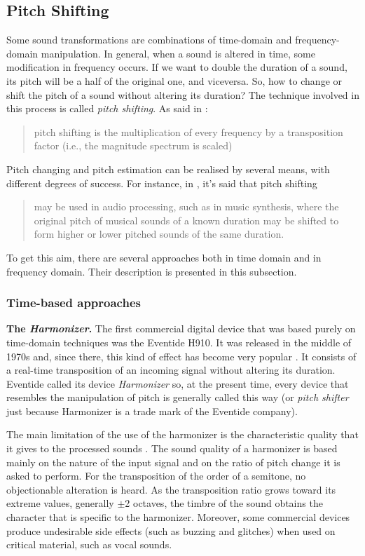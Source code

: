\subsection{Pitch Shifting}
\label{art1}
Some sound transformations are combinations of time-domain and frequency-domain manipulation. 
In general, when a sound is altered in time, some modification in frequency occurs. If we want to double the duration of a sound, its pitch will be a half of the original one, and viceversa. So, how to change or shift the pitch of a sound without altering its duration? The technique involved in this process is called \emph{pitch shifting}. As said in \cite{zolder2011dafx}:
\begin{quote}
\scriptsize pitch shifting is the multiplication of every frequency by a transposition factor (i.e., the magnitude spectrum is scaled)
\end{quote}

Pitch changing and pitch estimation can be realised by several means, with different degrees of success. 
For instance, in \cite{laroche2003phase}, it's said that pitch shifting
\begin{quote}
\scriptsize may be used in audio processing, such as in music synthesis, where the original pitch of musical sounds of a known duration may be shifted to form higher or lower pitched sounds of the same duration.
\end{quote}
To get this aim, there are several approaches both in time domain and in frequency domain. Their description is presented in this subsection.

\subsubsection{Time-based approaches}
\label{subsec:time}

\textbf{The \emph{Harmonizer}.}
The first commercial digital device that was based purely on time-domain techniques was the Eventide H910. It was released in the middle of 1970s and, since there, this kind of effect has become very popular \cite{roads1996tutorial}. It consists of a real-time transposition of an incoming signal without altering its duration. Eventide called its device \emph{Harmonizer} so, at the present time, every device that resembles the manipulation of pitch is generally called this way (or \emph{pitch shifter} just because Harmonizer is a trade mark of the Eventide company).

The main limitation of the use of the harmonizer is the characteristic quality that it gives to the processed sounds \cite{zolder2011dafx}. The sound quality of a harmonizer is based mainly on the nature of the input signal and on the ratio of pitch change it is asked to perform. For the transposition of the order of a semitone, no objectionable alteration is heard. As the transposition ratio grows toward its extreme values, generally $\pm$2 octaves, the timbre of the sound obtains the character that is specific to the harmonizer. Moreover, some commercial devices produce undesirable side effects (such as buzzing and glitches) when used on critical material, such as vocal sounds.

